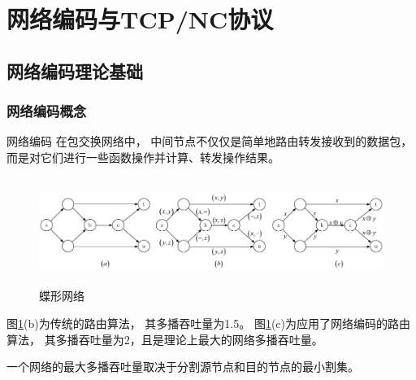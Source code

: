 \section{网络编码与TCP/NC协议}

\subsection{网络编码理论基础}
\begin{frame}[allowframebreaks,t]
	\frametitle{网络编码概念}
	\begin{block}{网络编码}
		\footnotesize
		在包交换网络中，
		中间节点不仅仅是简单地路由转发接收到的数据包，
		而是对它们进行一些函数操作并计算、转发操作结果。
	\end{block}
	\vspace{-1em}
	\begin{figure}[t]
	\includegraphics[height=3.5cm]{../figures/butter.eps}
	\caption{蝶形网络}
	\label{fig:butter}
	\end{figure}
	图\ref{fig:butter}(b)为传统的路由算法，
	其多播吞吐量为1.5。
	图\ref{fig:butter}(c)为应用了网络编码的路由算法，
	其多播吞吐量为2，且是理论上最大的网络多播吞吐量。
	\begin{mytheorem}
	一个网络的最大多播吞吐量取决于分割源节点和目的节点的最小割集\supercite{Ahlswede2000}。
	\end{mytheorem}
\end{frame}
